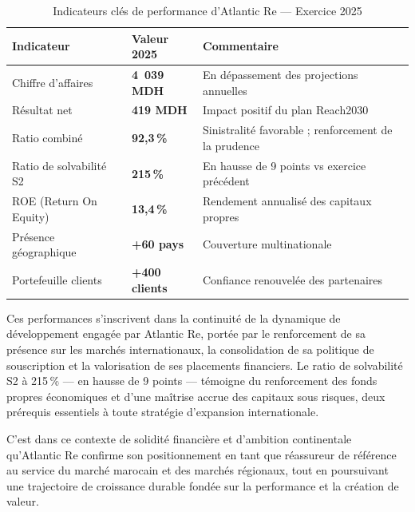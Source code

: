\documentclass[../main.tex]{subfiles}
\begin{document}
\begin{table}[H]
\centering
\caption{Indicateurs clés de performance d'Atlantic Re --- Exercice 2025}
\label{tab:kpi_atlanticre}
\small
\begin{tabularx}{\textwidth}{@{}p{5cm}p{3cm}X@{}}
\toprule
\textbf{Indicateur} & \textbf{Valeur 2025} & \textbf{Commentaire} \\
\midrule
Chiffre d'affaires            & \textbf{4~039 MDH}  & En dépassement des projections annuelles \\
Résultat net                  & \textbf{419 MDH}    & Impact positif du plan Reach2030 \\
Ratio combiné                 & \textbf{92,3\,\%}   & Sinistralité favorable ; renforcement de la prudence \\
Ratio de solvabilité S2       & \textbf{215\,\%}    & En hausse de 9 points vs exercice précédent \\
ROE (Return On Equity)        & \textbf{13,4\,\%}   & Rendement annualisé des capitaux propres \\
Présence géographique         & \textbf{+60 pays}   & Couverture multinationale \\
Portefeuille clients          & \textbf{+400 clients} & Confiance renouvelée des partenaires \\
\bottomrule
\end{tabularx}
\end{table}

Ces performances s'inscrivent dans la continuité de la dynamique de développement
engagée par Atlantic Re, portée par le renforcement de sa présence sur les marchés
internationaux, la consolidation de sa politique de souscription et la valorisation
de ses placements financiers. Le ratio de solvabilité S2 à 215\,\% --- en hausse de
9 points --- témoigne du renforcement des fonds propres économiques et d'une maîtrise
accrue des capitaux sous risques, deux prérequis essentiels à toute stratégie
d'expansion internationale.

C'est dans ce contexte de solidité financière et d'ambition continentale qu'Atlantic
Re confirme son positionnement en tant que réassureur de référence au service du
marché marocain et des marchés régionaux, tout en poursuivant une trajectoire de
croissance durable fondée sur la performance et la création de valeur.
\end{document}
